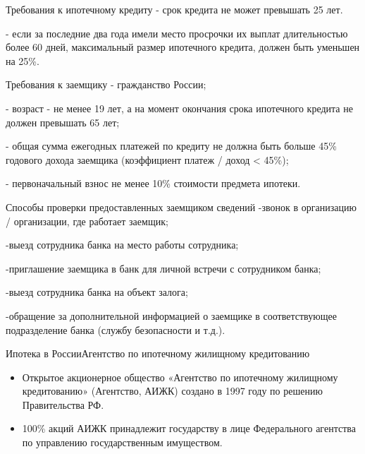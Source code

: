 \documentclass[_Banking_p2.tex]{subfiles}
\begin{document}
\begin{frame}{Требования к ипотечному кредиту}
- срок кредита не может превышать 25 лет.

- если за последние два года имели место просрочки их выплат длительностью более 60 дней, максимальный размер ипотечного кредита, должен быть уменьшен на 25\%.

\end{frame}

\begin{frame}{Требования к заемщику}
- гражданство России;

- возраст - не менее 19 лет, а на момент окончания срока ипотечного кредита не должен превышать 65 лет;

- общая сумма ежегодных платежей по кредиту не должна быть больше 45\% годового дохода заемщика (коэффициент платеж / доход < 45\%);

- первоначальный взнос не менее 10\% стоимости предмета ипотеки.
\end{frame}


\begin{frame}{Способы проверки предоставленных заемщиком сведений}
-звонок в организацию / организации, где работает заемщик;

-выезд сотрудника банка на место работы сотрудника;

-приглашение заемщика в банк для личной встречи с сотрудником банка;

-выезд сотрудника банка на объект залога;

-обращение за дополнительной информацией о заемщике в соответствующее подразделение банка (службу безопасности и т.д.).
\end{frame}

\begin{frame}{Ипотека в России}{Агентство по ипотечному жилищному кредитованию}
\begin{itemize}[<	+->]
\item
Открытое акционерное общество «Агентство по ипотечному жилищному кредитованию» (Агентство, АИЖК) создано в 1997 году по решению Правительства РФ. 

\item
100\% акций АИЖК принадлежит государству в лице Федерального агентства по управлению государственным имуществом.
\end{itemize}
\end{frame}
\end{document}
